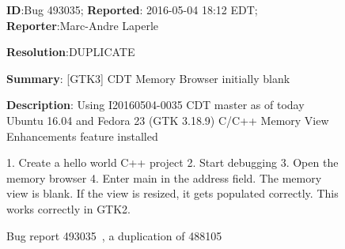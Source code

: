 




\begin{figure}
\sf
\scriptsize
\textbf{ID}:Bug 493035; \textbf{Reported}: 2016-05-04 18:12 EDT; \textbf{Reporter}:Marc-Andre Laperle

\textbf{Resolution}:DUPLICATE

\textbf{Summary}: [GTK3] CDT Memory Browser initially blank

\textbf{Description}: 
Using I20160504-0035
CDT master as of today
Ubuntu 16.04 and Fedora 23 (GTK 3.18.9)
C/C++ Memory View Enhancements feature installed

1. Create a hello world C++ project
2. Start debugging
3. Open the memory browser
4. Enter main in the address field. The memory view is blank.
If the view is resized, it gets populated correctly. This works correctly in GTK2.
\caption{Bug report 493035~\cite{bug493035}, a duplication of 488105}
\label{fig:br2}
\end{figure}




